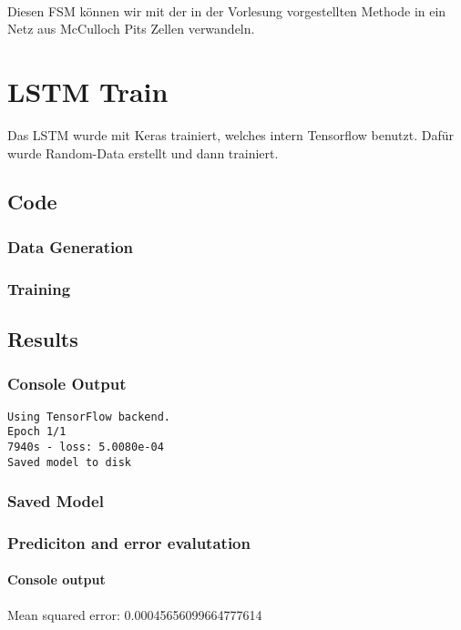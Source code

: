 \documentclass{article}
\begin{document}
\paragraph{}
Diesen FSM können wir mit der in der Vorlesung vorgestellten Methode in ein Netz aus McCulloch Pits Zellen verwandeln.

\section{LSTM Train}
Das LSTM wurde mit Keras trainiert, welches intern Tensorflow benutzt. Dafür wurde Random-Data erstellt und dann trainiert.
\subsection{Code}
\subsubsection{Data Generation}

\subsubsection{Training}

\subsection{Results}
\subsubsection{Console Output}
\begin{lstlisting}
Using TensorFlow backend.
Epoch 1/1
7940s - loss: 5.0080e-04
Saved model to disk
\end{lstlisting}
\subsubsection{Saved Model}

\subsubsection{Prediciton and error evalutation}


\paragraph{Console output}
Mean squared error: 0.00045656099664777614
\end{document}
